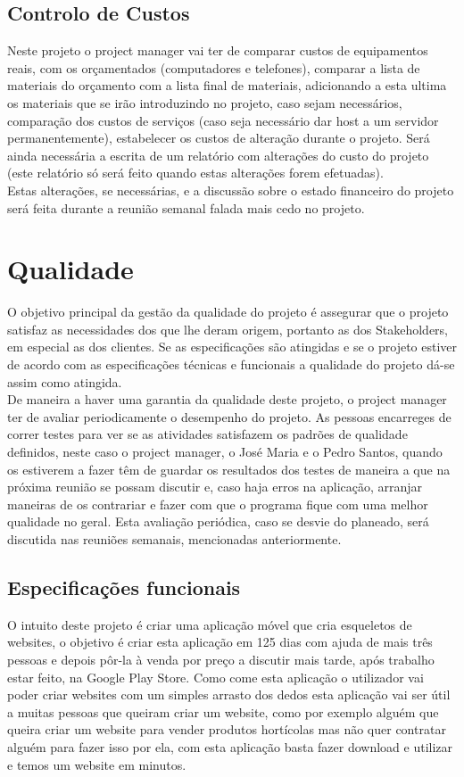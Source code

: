 \documentclass[a4paper]{article}
\begin{document}
\newpage

\subsection{Controlo de Custos}

Neste projeto o project manager vai ter de comparar custos de equipamentos reais, com os orçamentados (computadores e telefones), comparar a lista de materiais do orçamento com a lista final de materiais, adicionando a esta ultima os materiais que se irão introduzindo no projeto, caso sejam necessários, comparação dos custos de serviços (caso seja necessário dar host a um servidor permanentemente), estabelecer os custos de alteração durante o projeto. Será ainda necessária a escrita de um relatório com alterações do custo do projeto (este relatório só será feito quando estas alterações forem efetuadas).\\
Estas alterações, se necessárias, e a discussão sobre o estado financeiro do projeto será feita durante a reunião semanal falada mais cedo no projeto.

\section{Qualidade}

O objetivo principal da gestão da qualidade do projeto é assegurar que o projeto satisfaz as necessidades dos que lhe deram origem, portanto as dos Stakeholders, em especial as dos clientes. Se as especificações são atingidas e se o projeto estiver de acordo com as especificações técnicas e funcionais a qualidade do projeto dá-se assim como atingida. \\
De maneira a haver uma garantia da qualidade deste projeto, o project manager ter de avaliar periodicamente o desempenho do projeto. As pessoas encarreges de correr testes para ver se as atividades satisfazem os padrões de qualidade definidos, neste caso o project manager, o José Maria e o Pedro Santos, quando os estiverem a fazer têm de guardar os resultados dos testes de maneira a que na próxima reunião se possam discutir e, caso haja erros na aplicação, arranjar maneiras de os contrariar e fazer com que o programa fique com uma melhor qualidade no geral. Esta avaliação periódica, caso se desvie do planeado, será discutida nas reuniões semanais, mencionadas anteriormente.

\subsection{Especificações funcionais}
O intuito deste projeto é criar uma aplicação móvel que cria esqueletos de websites, o objetivo é criar esta aplicação em 125 dias com ajuda de mais três pessoas e depois pôr-la à venda por preço a discutir mais tarde, após trabalho estar feito, na Google Play Store. Como come esta aplicação o utilizador vai poder criar websites com um simples arrasto dos dedos esta aplicação vai ser útil a muitas pessoas que queiram criar um website, como por exemplo alguém que queira criar um website para vender produtos hortícolas mas não quer contratar alguém para fazer isso por ela, com esta aplicação basta fazer download e utilizar e temos um website em minutos.
\end{document}

